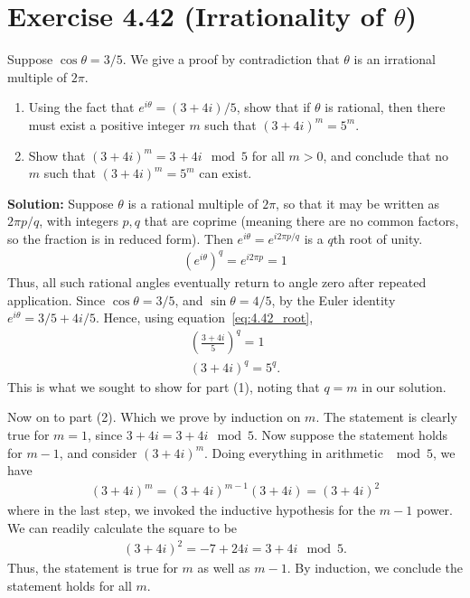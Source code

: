 \documentclass{book}
\begin{document}
\section*{Exercise 4.42 (Irrationality of $\theta$)}
    Suppose $\cos \theta = 3/5$. We give a proof by contradiction that $\theta$ is an irrational multiple of $2\pi$.
    \begin{enumerate}
        \item Using the fact that $e^{i\theta} = (3 + 4i)/5$, show that if $\theta$ is rational, then there must exist a positive integer $m$ such that $(3 + 4i)^m = 5^m$.
        \item Show that $(3 + 4i)^m = 3 + 4i \mod{5}$ for all $m>0$, and conclude that no $m$ such that $(3 + 4i)^m = 5^m$ can exist.
    \end{enumerate}

    \textbf{Solution:} Suppose $\theta$ is a rational multiple of $2\pi$, so that it may be written as $2\pi p/q$, with integers $p, q$ that are coprime (meaning there are no common factors, so the fraction is in reduced form). Then $e^{i\theta} = e^{i2\pi p/q}$ is a $q$th root of unity.
    \begin{align} \label{eq:4.42_root}
        (e^{i\theta})^q = e^{i2\pi p} = 1
    \end{align}
    Thus, all such rational angles eventually return to angle zero after repeated application. Since $\cos\theta = 3/5$, and $\sin \theta = 4/5$, by the Euler identity $e^{i\theta} = 3/5 + 4i/5$. Hence, using equation~\eqref{eq:4.42_root},
    \begin{align}
        \left(\frac{3 + 4i}{5}\right)^q = 1 \\
        (3 + 4i)^q = 5^q.
    \end{align}
    This is what we sought to show for part (1), noting that $q = m$ in our solution. 

    Now on to part (2). Which we prove by induction on $m$. The statement is clearly true for $m = 1$, since $3 + 4i = 3 + 4i \mod{5}$. Now suppose the statement holds for $m - 1$, and consider $(3 + 4i)^m$. Doing everything in arithmetic $\mod{5}$, we have
    \begin{align}
        (3 + 4i)^m = (3 + 4i)^{m-1}(3+4i) = (3 + 4i)^2
    \end{align}
    where in the last step, we invoked the inductive hypothesis for the $m-1$ power. We can readily calculate the square to be
    \begin{align}
        (3 + 4i)^2 = -7 + 24i = 3 + 4i \mod{5}.
    \end{align}
    Thus, the statement is true for $m$ as well as $m -1$. By induction, we conclude the statement holds for all $m$.
\end{document}
